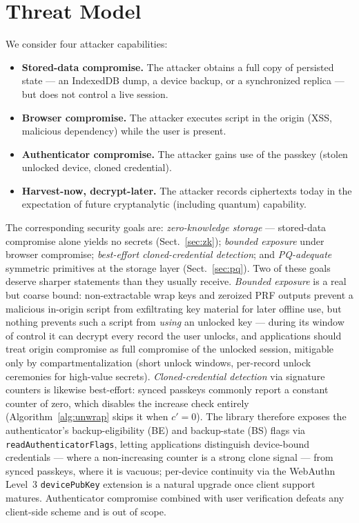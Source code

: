 \documentclass[runningheads]{llncs}
\begin{document}
\section{Threat Model}
We consider four attacker capabilities:
\begin{itemize}
  \item \textbf{Stored-data compromise.} The attacker obtains a full copy of persisted state --- an IndexedDB dump, a device backup, or a synchronized replica --- but does not control a live session.
  \item \textbf{Browser compromise.} The attacker executes script in the origin (XSS, malicious dependency) while the user is present.
  \item \textbf{Authenticator compromise.} The attacker gains use of the passkey (stolen unlocked device, cloned credential).
  \item \textbf{Harvest-now, decrypt-later.} The attacker records ciphertexts today in the expectation of future cryptanalytic (including quantum) capability.
\end{itemize}
The corresponding security goals are: \emph{zero-knowledge storage} --- stored-data compromise alone yields no secrets (Sect.~\ref{sec:zk}); \emph{bounded exposure} under browser compromise; \emph{best-effort cloned-credential detection}; and \emph{PQ-adequate} symmetric primitives at the storage layer (Sect.~\ref{sec:pq}).
Two of these goals deserve sharper statements than they usually receive.
\emph{Bounded exposure} is a real but coarse bound: non-extractable wrap keys and zeroized PRF outputs prevent a malicious in-origin script from exfiltrating key material for later offline use, but nothing prevents such a script from \emph{using} an unlocked key --- during its window of control it can decrypt every record the user unlocks, and applications should treat origin compromise as full compromise of the unlocked session, mitigable only by compartmentalization (short unlock windows, per-record unlock ceremonies for high-value secrets).
\emph{Cloned-credential detection} via signature counters is likewise best-effort: synced passkeys commonly report a constant counter of zero, which disables the increase check entirely (Algorithm~\ref{alg:unwrap} skips it when $c'{=}0$).
The library therefore exposes the authenticator's backup-eligibility (BE) and backup-state (BS) flags via \texttt{readAuthenticatorFlags}, letting applications distinguish device-bound credentials --- where a non-increasing counter is a strong clone signal --- from synced passkeys, where it is vacuous; per-device continuity via the WebAuthn Level~3 \texttt{devicePubKey} extension is a natural upgrade once client support matures.
Authenticator compromise combined with user verification defeats any client-side scheme and is out of scope.
\end{document}
